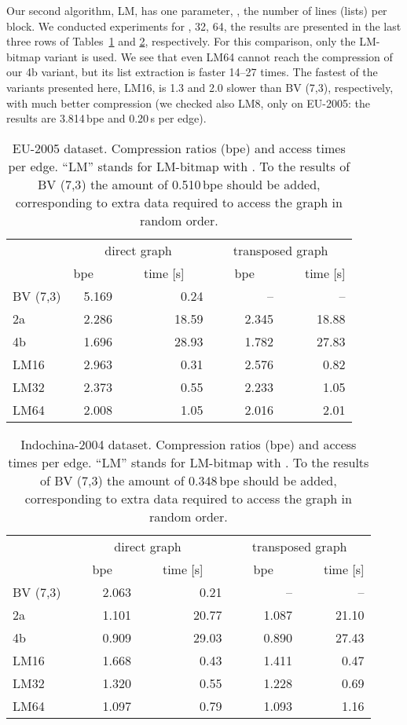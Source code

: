 \documentclass[envcountsame]{llncs}
\begin{document}
Our second algorithm, LM, has one parameter, , the number of lines (lists) per block.
We conducted experiments for , 32, 64, the results are presented in the 
last three rows of Tables~\ref{table:eu} and \ref{table:indochina}, respectively.
For this comparison, only the LM-bitmap variant is used.
We see that even LM64 cannot reach the compression of our 4b variant, but its list 
extraction is faster 14--27 times. The fastest of the variants presented here, LM16, 
is 1.3 and 2.0 slower than BV (7,3), respectively, with much better compression 
(we checked also LM8, only on EU-2005: the results are 3.814\,bpe and 0.20\,s 
per edge).


\begin{table}
\centering
\begin{tabular}{lrrrr}
\hline
        & \multicolumn{2}{c}{direct graph} & \multicolumn{2}{c}{transposed graph} \\
\cline{2-5}
        &  bpe~~~&~~~time [s]~~~&~~~bpe~~~&~~~time [s] \\
\hline
BV (7,3) & 5.169 & 0.24 & -- & -- \\
2a & 2.286 & 18.59 & 2.345 & 18.88 \\
4b & 1.696 & 28.93 & 1.782 & 27.83 \\
LM16 & 2.963 & 0.31 & 2.576 & 0.82 \\
LM32 & 2.373 & 0.55 & 2.233 & 1.05 \\
LM64 & 2.008 & 1.05 & 2.016 & 2.01 \\
\hline
\end{tabular}
\vspace{4mm}
\caption{EU-2005 dataset. Compression ratios (bpe) and access times per edge. 
``LM'' stands for LM-bitmap with .
To the results of BV (7,3) the amount of 0.510\,bpe should be added, corresponding 
to extra data required to access the graph in random order.}
\label{table:eu}
\end{table}


\begin{table}
\centering
\begin{tabular}{lrrrr}
\hline
        & \multicolumn{2}{c}{direct graph} & \multicolumn{2}{c}{transposed graph} \\
\cline{2-5}
     ~~~&~~~bpe~~~&~~~time [s]~~~&~~~bpe~~~&~~~time [s] \\
\hline
BV (7,3) & 2.063 & 0.21 & -- & -- \\
2a & 1.101 & 20.77 & 1.087 & 21.10 \\
4b & 0.909 & 29.03 & 0.890 & 27.43 \\
LM16 & 1.668 & 0.43 & 1.411 & 0.47 \\
LM32 & 1.320 & 0.55 & 1.228 & 0.69 \\
LM64 & 1.097 & 0.79 & 1.093 & 1.16 \\
\hline
\end{tabular}
\vspace{4mm}
\caption{Indochina-2004 dataset. Compression ratios (bpe) and access times per edge.
``LM'' stands for LM-bitmap with .
To the results of BV (7,3) the amount of 0.348\,bpe should be added, corresponding 
to extra data required to access the graph in random order.}
\label{table:indochina}
\end{table}
\end{document}
